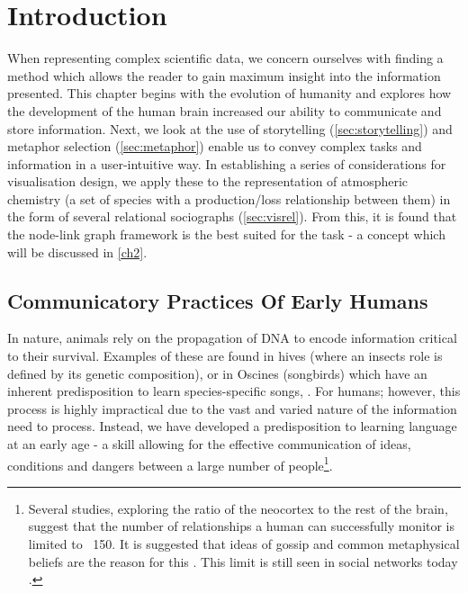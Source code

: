 

\section{Introduction}\label{sec:visbg}

When representing complex scientific data, we concern ourselves with finding a method which allows the reader to gain maximum insight into the information presented. This chapter begins with the evolution of humanity and explores how the development of the human brain increased our ability to communicate and store information. Next, we look at the use of storytelling (\autoref{sec:storytelling}) and metaphor selection (\autoref{sec:metaphor}) enable us to convey complex tasks and information in a user-intuitive way. In establishing a series of considerations for visualisation design, we apply these to the representation of atmospheric chemistry (a set of species with a production/loss relationship between them) in the form of several relational sociographs (\autoref{sec:visrel}). From this, it is found that the node-link graph framework is the best suited for the task - a concept which will be discussed in \autoref{ch2}.

\subsection{Communicatory Practices Of Early Humans}

In nature, animals rely on the propagation of DNA to encode information critical to their survival. Examples of these are found in hives (where an insects role is defined by its genetic composition), or in Oscines (songbirds) which have an inherent predisposition to learn species-specific songs, \citep{modelingpythonbees,genomics,birds,birdsongs,sapiens}. For humans; however, this process is highly impractical due to the vast and varied nature of the information need to process. Instead, we have developed a predisposition to learning language at an early age - a skill allowing for the effective communication of ideas, conditions and dangers between a large number of people\footnote{Several studies, exploring the ratio of the neocortex to the rest of the brain, suggest that the number of relationships a human can successfully monitor is limited to ~150. It is suggested that ideas of gossip and common metaphysical beliefs are the reason for this \citep{sapiens,neo,gossip}. This limit is still seen in social networks today \citep{social}.}.

